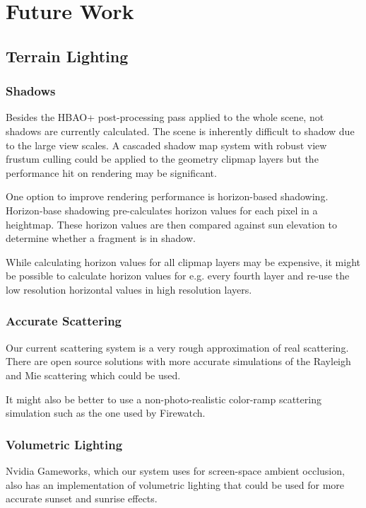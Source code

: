 
\chapter{Future Work}

\section{Terrain Lighting}

\subsection{Shadows}

Besides the HBAO+ post-processing pass applied to the whole scene, not shadows are currently calculated.
The scene is inherently difficult to shadow due to the large view scales.
A cascaded shadow map system with robust view frustum culling could be applied to the geometry clipmap layers but the performance hit on rendering may be significant.

One option to improve rendering performance is horizon-based shadowing.
Horizon-base shadowing pre-calculates horizon values for each pixel in a heightmap.
These horizon values are then compared against sun elevation to determine whether a fragment is in shadow.

While calculating horizon values for all clipmap layers may be expensive, it might be possible to calculate horizon values for e.g. every fourth layer and re-use the low resolution horizontal values in high resolution layers.

\subsection{Accurate Scattering}

Our current scattering system is a very rough approximation of real scattering.
There are open source solutions with more accurate simulations of the Rayleigh and Mie scattering which could be used.

It might also be better to use a non-photo-realistic color-ramp scattering simulation such as the one used by Firewatch.

\subsection{Volumetric Lighting}

Nvidia Gameworks, which our system uses for screen-space ambient occlusion, also has an implementation of volumetric lighting that could be used for more accurate sunset and sunrise effects.


